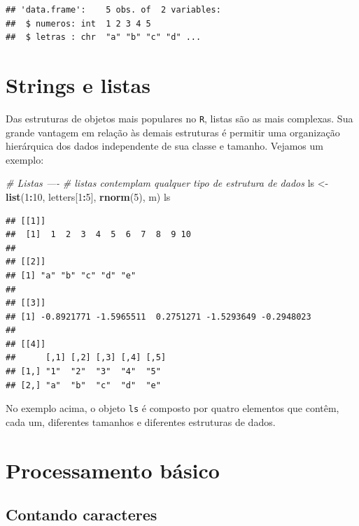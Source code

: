 \documentclass[]{book}
\newenvironment{Shaded}{\begin{snugshade}}{\end{snugshade}}
\newcommand{\CommentTok}[1]{\textcolor[rgb]{0.56,0.35,0.01}{\textit{#1}}}
\newcommand{\DecValTok}[1]{\textcolor[rgb]{0.00,0.00,0.81}{#1}}
\newcommand{\KeywordTok}[1]{\textcolor[rgb]{0.13,0.29,0.53}{\textbf{#1}}}
\newcommand{\NormalTok}[1]{#1}
\newcommand{\OperatorTok}[1]{\textcolor[rgb]{0.81,0.36,0.00}{\textbf{#1}}}
\newcommand{\StringTok}[1]{\textcolor[rgb]{0.31,0.60,0.02}{#1}}
\begin{document}
\begin{verbatim}
## 'data.frame':	5 obs. of  2 variables:
##  $ numeros: int  1 2 3 4 5
##  $ letras : chr  "a" "b" "c" "d" ...
\end{verbatim}

\hypertarget{strings-e-listas}{%
\section{Strings e listas}\label{strings-e-listas}}

Das estruturas de objetos mais populares no \texttt{R}, listas são as mais complexas. Sua grande vantagem em relação às demais estruturas é permitir uma organização hierárquica dos dados independente de sua classe e tamanho. Vejamos um exemplo:

\begin{Shaded}
\begin{Highlighting}[]
\CommentTok{# Listas ----}
\CommentTok{# listas contemplam qualquer tipo de estrutura de dados}
\NormalTok{ls <-}\StringTok{ }\KeywordTok{list}\NormalTok{(}\DecValTok{1}\OperatorTok{:}\DecValTok{10}\NormalTok{, letters[}\DecValTok{1}\OperatorTok{:}\DecValTok{5}\NormalTok{], }\KeywordTok{rnorm}\NormalTok{(}\DecValTok{5}\NormalTok{), m)}
\NormalTok{ls}
\end{Highlighting}
\end{Shaded}

\begin{verbatim}
## [[1]]
##  [1]  1  2  3  4  5  6  7  8  9 10
## 
## [[2]]
## [1] "a" "b" "c" "d" "e"
## 
## [[3]]
## [1] -0.8921771 -1.5965511  0.2751271 -1.5293649 -0.2948023
## 
## [[4]]
##      [,1] [,2] [,3] [,4] [,5]
## [1,] "1"  "2"  "3"  "4"  "5" 
## [2,] "a"  "b"  "c"  "d"  "e"
\end{verbatim}

No exemplo acima, o objeto \texttt{ls} é composto por quatro elementos que contêm, cada um, diferentes tamanhos e diferentes estruturas de dados.

\hypertarget{processamento-buxe1sico}{%
\section{Processamento básico}\label{processamento-buxe1sico}}

\hypertarget{contando-caracteres}{%
\subsection{Contando caracteres}\label{contando-caracteres}}
\end{document}
